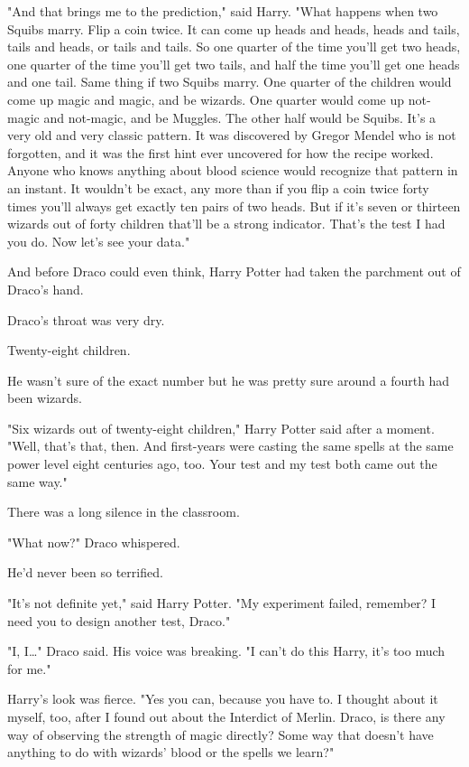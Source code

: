 "And that brings me to the prediction," said Harry. "What happens when two
Squibs marry. Flip a coin twice. It can come up heads and heads, heads and
tails, tails and heads, or tails and tails. So one quarter of the time you'll
get two heads, one quarter of the time you'll get two tails, and half the time
you'll get one heads and one tail. Same thing if two Squibs marry. One quarter
of the children would come up magic and magic, and be wizards. One quarter
would come up not-magic and not-magic, and be Muggles. The other half would be
Squibs. It's a very old and very classic pattern. It was discovered by Gregor
Mendel who is not forgotten, and it was the first hint ever uncovered for how
the recipe worked. Anyone who knows anything about blood science would
recognize that pattern in an instant. It wouldn't be exact, any more than if
you flip a coin twice forty times you'll always get exactly ten pairs of two
heads. But if it's seven or thirteen wizards out of forty children that'll be a
strong indicator. That's the test I had you do. Now let's see your data."

And before Draco could even think, Harry Potter had taken the parchment out of
Draco's hand.

Draco's throat was very dry.

Twenty-eight children.

He wasn't sure of the exact number but he was pretty sure around a fourth had
been wizards.

"Six wizards out of twenty-eight children," Harry Potter said after a moment.
"Well, that's that, then. And first-years were casting the same spells at the
same power level eight centuries ago, too. Your test and my test both came out
the same way."

There was a long silence in the classroom.

"What now?" Draco whispered.

He'd never been so terrified.

"It's not definite yet," said Harry Potter. "My experiment failed, remember? I
need you to design another test, Draco."

"I, I…" Draco said. His voice was breaking. "I can't do this Harry, it's
too much for me."

Harry's look was fierce. "Yes you can, because you have to. I thought about it
myself, too, after I found out about the Interdict of Merlin. Draco, is there
any way of observing the strength of magic directly? Some way that doesn't have
anything to do with wizards' blood or the spells we learn?"

